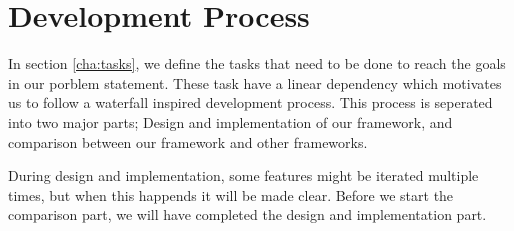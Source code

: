 \section{Development Process}
In section \ref{cha:tasks}, we define the tasks that need to be done to reach the goals in our porblem statement. These task have a linear dependency which motivates us to follow a waterfall inspired development process. This process is seperated into two major parts; Design and implementation of our framework, and comparison between our framework and other frameworks. 

During design and implementation, some features might be iterated multiple times, but when this happends it will be made clear. Before we start the comparison part, we will have completed the design and implementation part.

